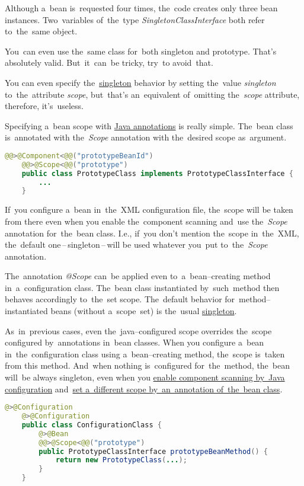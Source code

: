 \noindent Although a~bean is~requested four times, the~code creates only three bean instances.
Two~variables of~the~type \textit{SingletonClassInterface} both refer to~the~same object.

\note You~can even use the~same class for~both singleton and prototype.
That's absolutely valid.
But~it~can~be tricky, try~to avoid~that.

\note You can even specify the~\hyperref[singletondp]{singleton} behavior by setting the~value \textit{singleton} to~the~attribute \textit{scope}, but~that's an~equivalent of~omitting the~\textit{scope} attribute, therefore, it's~useless.

\label{bsannotations}
Specifying a~bean scope with \hyperref[javaannotation]{Java annotations} is really simple.
The~bean class is~annotated with the~\textit{Scope} annotation with the~desired scope as~argument.

\example
\begin{lstlisting}[language=Java, title={Bean class with the prototype scope set by the annotation}]@@>@Component<@@("prototypeBeanId")
    @@>@Scope<@@("prototype")
    public class PrototypeClass implements PrototypeClassInterface {
        ...
    }
\end{lstlisting}

\warning If~you configure a~bean in~the~XML configuration file, the~scope will be taken from there even when you enable the~component scanning and~use the~\textit{Scope} annotation for~the~bean class.
I.e., if~you don't mention the~scope in~the~XML, the~default one\,--\,singleton\,--\,will be used whatever you~put to~the~\textit{Scope} annotation.

The~annotation \textit{@Scope} can~be applied even to~a~bean--creating method in~a~configuration class.
The~bean class instantiated by~such~method then behaves accordingly to~the~set scope.
The~default behavior for~method--instantiated beans (without a~scope~set) is the~usual \hyperref[singletondp]{singleton}.

\warning As~in~previous cases, even the~java--configured scope overrides the~scope configured by~annotations in~bean classes.
When you configure a~bean in~the~configuration class using a~bean--creating method, the~scope is~taken from this method.
And~when nothing is~configured for~the~method, the~bean will~be always singleton, even when you \hyperref[iocnoxml]{enable component scanning by~Java configuration} and~\hyperref[bsannotations]{set a~different scope by~an~annotation of~the~bean class}.

\example
\enlargethispage{10mm}
\thispagestyle{empty}
\begin{lstlisting}[language=Java, title={Configuration class with a prototype bean--creating metod}]@>@Configuration
    @>@Configuration
    public class ConfigurationClass {
        @>@Bean
        @@>@Scope<@@("prototype")
        public PrototypeClassInterface prototypeBeanMethod() {
            return new PrototypeClass(...);
        }
    }
\end{lstlisting}
\newpage
